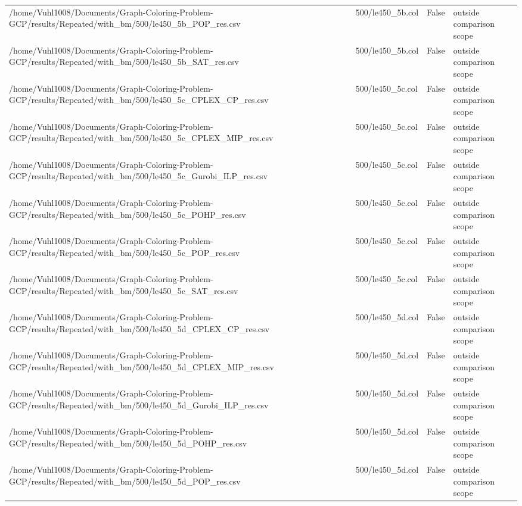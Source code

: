 \begin{table}[htbp]
\begin{tabular}{llll}
/home/Vuhl1008/Documents/Graph-Coloring-Problem-GCP/results/Repeated/with\_bm/500/le450\_5b\_POP\_res.csv & 500/le450\_5b.col & False & outside comparison scope \\
/home/Vuhl1008/Documents/Graph-Coloring-Problem-GCP/results/Repeated/with\_bm/500/le450\_5b\_SAT\_res.csv & 500/le450\_5b.col & False & outside comparison scope \\
/home/Vuhl1008/Documents/Graph-Coloring-Problem-GCP/results/Repeated/with\_bm/500/le450\_5c\_CPLEX\_CP\_res.csv & 500/le450\_5c.col & False & outside comparison scope \\
/home/Vuhl1008/Documents/Graph-Coloring-Problem-GCP/results/Repeated/with\_bm/500/le450\_5c\_CPLEX\_MIP\_res.csv & 500/le450\_5c.col & False & outside comparison scope \\
/home/Vuhl1008/Documents/Graph-Coloring-Problem-GCP/results/Repeated/with\_bm/500/le450\_5c\_Gurobi\_ILP\_res.csv & 500/le450\_5c.col & False & outside comparison scope \\
/home/Vuhl1008/Documents/Graph-Coloring-Problem-GCP/results/Repeated/with\_bm/500/le450\_5c\_POHP\_res.csv & 500/le450\_5c.col & False & outside comparison scope \\
/home/Vuhl1008/Documents/Graph-Coloring-Problem-GCP/results/Repeated/with\_bm/500/le450\_5c\_POP\_res.csv & 500/le450\_5c.col & False & outside comparison scope \\
/home/Vuhl1008/Documents/Graph-Coloring-Problem-GCP/results/Repeated/with\_bm/500/le450\_5c\_SAT\_res.csv & 500/le450\_5c.col & False & outside comparison scope \\
/home/Vuhl1008/Documents/Graph-Coloring-Problem-GCP/results/Repeated/with\_bm/500/le450\_5d\_CPLEX\_CP\_res.csv & 500/le450\_5d.col & False & outside comparison scope \\
/home/Vuhl1008/Documents/Graph-Coloring-Problem-GCP/results/Repeated/with\_bm/500/le450\_5d\_CPLEX\_MIP\_res.csv & 500/le450\_5d.col & False & outside comparison scope \\
/home/Vuhl1008/Documents/Graph-Coloring-Problem-GCP/results/Repeated/with\_bm/500/le450\_5d\_Gurobi\_ILP\_res.csv & 500/le450\_5d.col & False & outside comparison scope \\
/home/Vuhl1008/Documents/Graph-Coloring-Problem-GCP/results/Repeated/with\_bm/500/le450\_5d\_POHP\_res.csv & 500/le450\_5d.col & False & outside comparison scope \\
/home/Vuhl1008/Documents/Graph-Coloring-Problem-GCP/results/Repeated/with\_bm/500/le450\_5d\_POP\_res.csv & 500/le450\_5d.col & False & outside comparison scope \\

\end{tabular}
\end{table}
